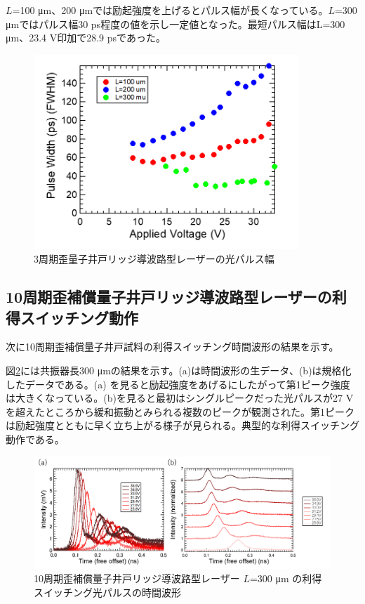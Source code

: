 {$L$=100 \si{\micro\metre}、200 \si{\micro\metre}では励起強度を上げるとパルス幅が長くなっている。$L$=300 \si{\micro\metre}ではパルス幅30 ps程度の値を示し一定値となった。最短パルス幅はL=300 \si{\micro m}、23.4 V印加で28.9 psであった。
\begin{figure}[ht]
	\centering
	\includegraphics[width=10cm]{figure/fig_3_2_3QW_ridge_GS_FWHM.png}
		\caption{3周期歪量子井戸リッジ導波路型レーザーの光パルス幅}
		\label{fig:fig_3_2_3QW_ridge_GS_FWHM}
\end{figure}
\clearpage
\subsection{10周期歪補償量子井戸リッジ導波路型レーザーの利得スイッチング動作}%
次に10周期歪補償量子井戸試料の利得スイッチング時間波形の結果を示す。

図\ref{fig:fig_3_2_10QW_ridge_L300_GS}には共振器長300 \si{\micro\metre}の結果を示す。(a)は時間波形の生データ、(b)は規格化したデータである。(a) を見ると励起強度をあげるにしたがって第1ピーク強度は大きくなっている。(b)を見ると最初はシングルピークだった光パルスが27 Vを超えたところから緩和振動とみられる複数のピークが観測された。第1ピークは励起強度とともに早く立ち上がる様子が見られる。典型的な利得スイッチング動作である。
\begin{figure}[h]
	\centering
	\includegraphics[width=15cm]{figure/fig_3_2_10QW_ridge_L300_GS.png}
		\caption{10周期歪補償量子井戸リッジ導波路型レーザー $L$=300 \si{\micro\metre} の利得スイッチング光パルスの時間波形}
		\label{fig:fig_3_2_10QW_ridge_L300_GS}
\end{figure}


}
